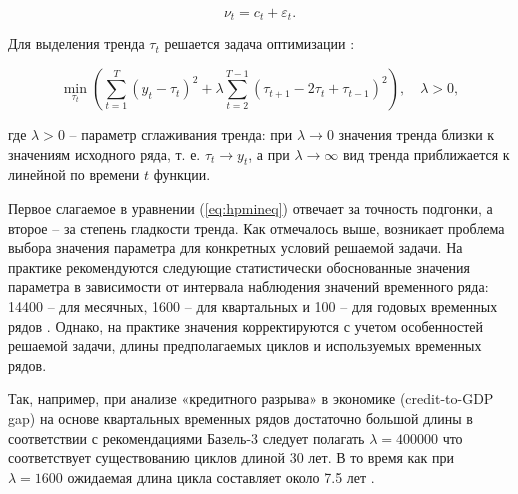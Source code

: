 \documentclass[a4paper,14pt]{extreport}
\begin{document}
	\begin{equation}
	\nu_t = c_t + \varepsilon_t .
	\label{eq:decomp2}
	\end{equation}
	
	Для выделения тренда $\tau_t$ решается задача оптимизации \cite{hp_orig_paper}: 
	
	
	
	\begin{equation}	
	{
		\min_{ \tau_t }{
			( 
			\sum_{t=1}^{T} (y_t-\tau_t)^2 + 
			\lambda \sum_{t=2}^{T-1} (\tau_{t+1} - 2\tau_t + \tau_{t-1})^2
			)
		}, \quad
		\lambda > 0, 
	}
	\label{eq:hpmineq}
	\end{equation}
	
	где $\lambda > 0$ -- параметр сглаживания тренда: при $\lambda \rightarrow 0$ значения тренда близки к значениям исходного ряда, т. е. $\tau_t \rightarrow y_t$, а при $\lambda \rightarrow \infty$ вид тренда приближается к линейной по времени $t$ функции.
	
	Первое слагаемое в уравнении (\ref{eq:hpmineq}) отвечает за точность подгонки, а второе -- за степень гладкости тренда. Как отмечалось выше, возникает проблема выбора значения параметра   для конкретных условий решаемой задачи. На практике рекомендуются следующие статистически обоснованные значения параметра   в зависимости от интервала наблюдения значений временного ряда: 14400 -- для месячных, 1600 -- для квартальных и 100 -- для годовых временных рядов \cite{hp_orig_paper}. Однако, на практике значения   корректируются с учетом особенностей решаемой задачи, длины предполагаемых циклов и используемых временных рядов. 
	
	Так, например, при анализе «кредитного разрыва» в экономике (credit-to-GDP gap) на основе квартальных временных рядов достаточно большой длины в соответствии с рекомендациями Базель-3 следует полагать $\lambda = 400000$  что соответствует существованию циклов длиной 30 лет.  В то время как при $\lambda = 1600$ ожидаемая длина цикла составляет около 7.5 лет \cite{schuler_detrend}.
	
\end{document}
